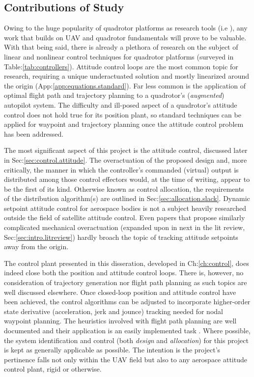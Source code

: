 \subsection{Contributions of Study}
\label{subsec:intro.foreword.significance}
Owing to the huge popularity of quadrotor platforms as research tools (i.e \cite{x4flyercontrol,intelligentbackstep,fullquadcoptercontrol}), any work that builds on UAV and quadrotor fundamentals will prove to be valuable. With that being said, there is already a plethora of research on the subject of linear and nonlinear control techniques for quadrotor platforms (surveyed in Table:\ref{tab:controllers}). Attitude control loops are the most common topic for research, requiring a unique underactuated solution and mostly linearized around the origin (App:\ref{app:equations.standard}). Far less common is the application of optimal flight path and trajectory planning to a quadrotor's (\emph{augmented}) autopilot system. The difficulty and ill-posed aspect of a quadrotor's attitude control does not hold true for its position plant, so standard techniques can be applied for waypoint and trajectory planning once the attitude control problem has been addressed.
\par
The most significant aspect of this project is the attitude control, discussed later in Sec:\ref{sec:control.attitude}. The overactuation of the proposed design and, more critically, the manner in which the controller's commanded (virtual) output is distributed among those control effectors would, at the time of writing, appear to be the first of its kind. Otherwise known as control allocation, the requirements of the distribution algorithm(s) are outlined in Sec:\ref{sec:allocation.slack}. Dynamic setpoint attitude control for aerospace bodies is not a subject heavily researched outside the field of satellite attitude control. Even papers that propose similarly complicated mechanical overactuation (expanded upon in next in the lit review, Sec:\ref{sec:intro.litreview}) hardly broach the topic of tracking attitude setpoints away from the origin.
\par
The control plant presented in this disseration, developed in Ch:\ref{ch:control}, does indeed close both the position and attitude control loops. There is, however, no consideration of trajectory generation nor flight path planning as such topics are well discussed elsewhere. Once closed-loop position and attitude control have been achieved, the control algorithms can be adjusted to incorporate higher-order state derivative (acceleration, jerk and jounce) tracking needed for nodal waypoint planning. The heuristics involved with flight path planning are well documented and their application is an easily implemented task \cite{trajectorygeneration,planning,trajectorytracking}. Where possible, the system identification and control (both \emph{design} and \emph{allocation}) for this project is kept as generally applicable as possible. The intention is the project's pertinence falls not only within the UAV field but also to any aerospace attitude control plant, rigid or otherwise. 
